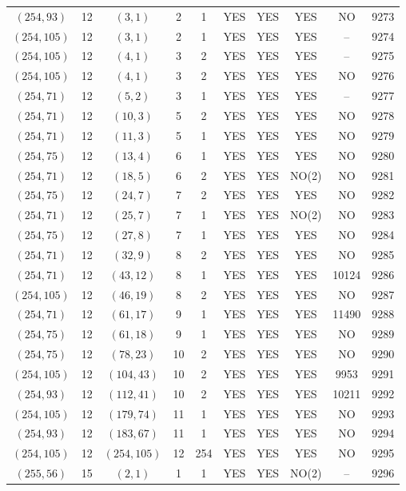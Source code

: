 \begin{longtable}{|c|c|c|c|c|c|c|c|c|c|}
$(254, 93)$ & 12 & $(3, 1)$ & 2 & 1 & YES & YES & YES & NO & 9273\\
$(254, 105)$ & 12 & $(3, 1)$ & 2 & 1 & YES & YES & YES & -- & 9274\\
$(254, 105)$ & 12 & $(4, 1)$ & 3 & 2 & YES & YES & YES & -- & 9275\\
$(254, 105)$ & 12 & $(4, 1)$ & 3 & 2 & YES & YES & YES & NO & 9276\\
$(254, 71)$ & 12 & $(5, 2)$ & 3 & 1 & YES & YES & YES & -- & 9277\\
$(254, 71)$ & 12 & $(10, 3)$ & 5 & 2 & YES & YES & YES & NO & 9278\\
$(254, 71)$ & 12 & $(11, 3)$ & 5 & 1 & YES & YES & YES & NO & 9279\\
$(254, 75)$ & 12 & $(13, 4)$ & 6 & 1 & YES & YES & YES & NO & 9280\\
$(254, 71)$ & 12 & $(18, 5)$ & 6 & 2 & YES & YES & NO(2) & NO & 9281\\
$(254, 75)$ & 12 & $(24, 7)$ & 7 & 2 & YES & YES & YES & NO & 9282\\
$(254, 71)$ & 12 & $(25, 7)$ & 7 & 1 & YES & YES & NO(2) & NO & 9283\\
$(254, 75)$ & 12 & $(27, 8)$ & 7 & 1 & YES & YES & YES & NO & 9284\\
$(254, 71)$ & 12 & $(32, 9)$ & 8 & 2 & YES & YES & YES & NO & 9285\\
$(254, 71)$ & 12 & $(43, 12)$ & 8 & 1 & YES & YES & YES & 10124 & 9286\\
$(254, 105)$ & 12 & $(46, 19)$ & 8 & 2 & YES & YES & YES & NO & 9287\\
$(254, 71)$ & 12 & $(61, 17)$ & 9 & 1 & YES & YES & YES & 11490 & 9288\\
$(254, 75)$ & 12 & $(61, 18)$ & 9 & 1 & YES & YES & YES & NO & 9289\\
$(254, 75)$ & 12 & $(78, 23)$ & 10 & 2 & YES & YES & YES & NO & 9290\\
$(254, 105)$ & 12 & $(104, 43)$ & 10 & 2 & YES & YES & YES & 9953 & 9291\\
$(254, 93)$ & 12 & $(112, 41)$ & 10 & 2 & YES & YES & YES & 10211 & 9292\\
$(254, 105)$ & 12 & $(179, 74)$ & 11 & 1 & YES & YES & YES & NO & 9293\\
$(254, 93)$ & 12 & $(183, 67)$ & 11 & 1 & YES & YES & YES & NO & 9294\\
$(254, 105)$ & 12 & $(254, 105)$ & 12 & 254 & YES & YES & YES & NO & 9295\\
$(255, 56)$ & 15 & $(2, 1)$ & 1 & 1 & YES & YES & NO(2) & -- & 9296\\

\end{longtable}
